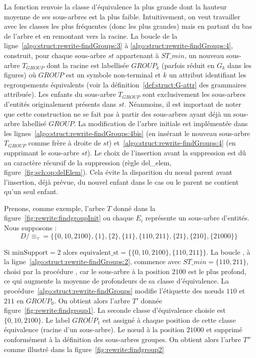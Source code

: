La fonction \findSTwithMinLeavesTree renvoie la classe d'équivalence la plus grande dont la hauteur moyenne de ses sous-arbres est la plus faible.
Intuitivement, on veut travailler avec les classes les plus fréquentes (donc les plus grandes) mais en partant du bas de l'arbre et en remontant vers la racine.
La boucle  de la ligne~\ref{algo:struct:rewrite-findGroups:3} à \ref{algo:struct:rewrite-findGroups:4}, construit, pour chaque sous-arbre $st$ appartenant à $ST\_min $, un nouveau sous-arbre $T_{GROUP}$ dont la racine est labellisée $GROUP_k$ (parfois réduit en $G_k$ dans les figures) où $GROUP$ est un symbole non-terminal et $k$ un attribut identifiant les regroupements équivalents (voir la définition~\ref{def:struct:G-attr} des grammaires attribuée).
Les enfants du sous-arbre $T_{GROUP}$ sont exclusivement les sous-arbres d'entités originalement présents dans $st$.
Néanmoins, il est important de noter que cette construction ne se fait pas à partir des sous-arbres ayant déjà un sous-arbre labellisé $GROUP$.
La modification de l'arbre initiale est implémentée dans les lignes~\ref{algo:struct:rewrite-findGroups:4bis} (en insérant le nouveau sous-arbre $T_{GROUP}$ comme frère à droite de $st$) et~\ref{algo:struct:rewrite-findGroups:4} (en supprimant le sous-arbre $st$).
Le choix de l'insertion avant la suppression est dû au caractère récursif de la suppression (règle \textsf{del\_elem}, figure~\ref{fig:sch:op:delElem}).
Cela évite la disparition du nœud parent avant l'insertion, déjà prévue, du nouvel enfant dans le cas ou le parent ne contient qu'un seul enfant.

\begin{example}
    Prenons, comme exemple, l'arbre $T$ donné dans la figure~\ref{fig:rewrite:findgroupInit} ou chaque $E_i$ représente un sous-arbre d'entités.
    Nous supposons :
    \[
        D/\equiv_\tau = \{\{0, 10, 2100\}, \{1\}, \{2\}, \{11\}, \{110, 211\} , \{21\} , \{210\} , \{21000\} \}
    \]

    Si $\text{minSupport} = 2$ alors $\text{equivalent\_st} = \{\{0, 10, 2100\}, \{110, 211\}\}$.
    La boucle , à la ligne~\ref{algo:struct:rewrite-findGroups:2}, commence avec $ST\_min = \{110, 211\}$, choisi par la procédure \findSTwithMinLeavesTree, car le sous-arbre à la position $2100$ est le plus profond, ce qui augmente la moyenne de profondeurs de sa classe d'équivalence.
    La procédure~\ref{algo:struct:rewrite-findGroups} modifie l'étiquette des nœuds $110$ et $211$ en $GROUP_0$.
    On obtient alors l'arbre $T'$ donnée figure~\ref{fig:rewrite:findgroup1}.
    La seconde classe d'équivalence choisie est $\{0, 10, 2100\}$.
    Le label $GROUP_1$ est assigné à chaque position de cette classe équivalence (racine d'un sous-arbre).
    Le nœud à la position $21000$ et supprimé conformément à la définition des sous-arbres groupes.
    On obtient alors l'arbre $T''$ comme illustré dans la figure~\ref{fig:rewrite:findgroup2}
\end{example}

